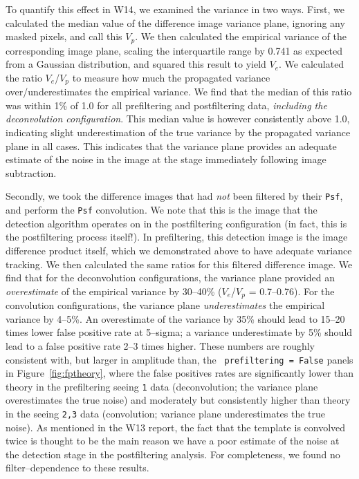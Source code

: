 \documentclass[prd, nofootinbib, floatfix, 11pt, tightenlines, times]{article}
\begin{document}
To quantify this effect in W14, we examined the variance in two ways.
First, we calculated the median value of the difference image variance
plane, ignoring any masked pixels, and call this $V_p$.  We then
calculated the empirical variance of the corresponding image plane,
scaling the interquartile range by 0.741 as expected from a Gaussian
distribution, and squared this result to yield $V_e$.  We calculated
the ratio $V_e$/$V_p$ to measure how much the propagated variance
over/underestimates the empirical variance.  We find that the median
of this ratio was within 1\% of 1.0 for all prefiltering and
postfiltering data, {\it including the deconvolution configuration}.
This median value is however consistently above 1.0, indicating slight
underestimation of the true variance by the propagated variance plane
in all cases.  This indicates that the variance plane provides an
adequate estimate of the noise in the image at the stage immediately
following image subtraction.

Secondly, we took the difference images that had {\it not} been
filtered by their {\tt Psf}, and perform the {\tt Psf} convolution.
We note that this is the image that the detection algorithm operates
on in the postfiltering configuration (in fact, this is the
postfiltering process itself!).  In prefiltering, this detection image
is the image difference product itself, which we demonstrated above to
have adequate variance tracking.  We then calculated the same ratios
for this filtered difference image.  We find that for the
deconvolution configurations, the variance plane provided an {\it
  overestimate} of the empirical variance by 30--40\% ($V_e$/$V_p$ =
0.7--0.76).  For the convolution configurations, the variance plane
{\it underestimates} the empirical variance by 4--5\%.  An
overestimate of the variance by 35\% should lead to 15--20 times lower
false positive rate at 5--sigma; a variance underestimate by 5\%
should lead to a false positive rate 2--3 times higher.  These numbers
are roughly consistent with, but larger in amplitude than, the {\tt
  prefiltering = False} panels in Figure~\ref{fig:fptheory}, where the
false positives rates are significantly lower than theory in the
prefiltering seeing {\tt 1} data (deconvolution; the variance plane
overestimates the true noise) and moderately but consistently higher
than theory in the seeing {\tt 2,3} data (convolution; variance plane
underestimates the true noise).  As mentioned in the W13 report, the
fact that the template is convolved twice is thought to be the main
reason we have a poor estimate of the noise at the detection stage in
the postfiltering analysis.  For completeness, we found no
filter--dependence to these results.
\end{document}
